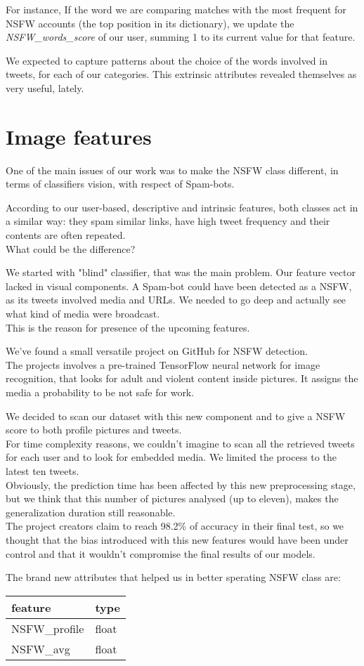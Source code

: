For instance, If the word we are comparing matches with the most frequent for NSFW accounts (the top position in its dictionary), we update the \textit{NSFW\_words\_score} of our user, summing 1 to its current value for that feature.

We expected to capture patterns about the choice of the words involved in tweets, for each of our categories.
This extrinsic attributes revealed themselves as very useful, lately.


\section{Image features}
One of the main issues of our work was to make the NSFW class different, in terms of classifiers vision, with respect of Spam-bots.

According to our user-based, descriptive and intrinsic features, both classes act in a similar way: they spam similar links, have high tweet frequency and their contents are often repeated.\\
What could be the difference?

We started with "blind" classifier, that was the main problem. Our feature vector lacked in visual components. A Spam-bot could have been detected as a NSFW, as its tweets involved media and URLs. We needed to go deep and actually see what kind of media were broadcast.\\
This is the reason for presence of the upcoming features.

We've found a small versatile project on GitHub for NSFW detection.\\
The projects involves a pre-trained TensorFlow neural network for image recognition, that looks for adult and violent content inside pictures. It assigns the media a probability to be not safe for work.

We decided to scan our dataset with this new component and to give a NSFW score to both profile pictures and tweets.\\
For time complexity reasons, we couldn't imagine to scan all the retrieved tweets for each user and to look for embedded media. We limited the process to the latest ten tweets.\\

Obviously, the prediction time has been affected by this new preprocessing stage, but we think that this number of pictures analysed (up to eleven), makes the generalization duration still reasonable.\\
The project creators claim to reach 98.2\% of accuracy in their final test, so we thought that the bias introduced with this new features would have been under control and that it wouldn't compromise the final results of our models.

The brand new attributes that helped us in better sperating NSFW class are:
\small
\begin{center}
	\begin{tabular}{ll}
		\\feature&type\\
		\hline\hline
		NSFW\_profile&float\\
		NSFW\_avg&float\\\hline
	\end{tabular}
\end{center}
\normalsize